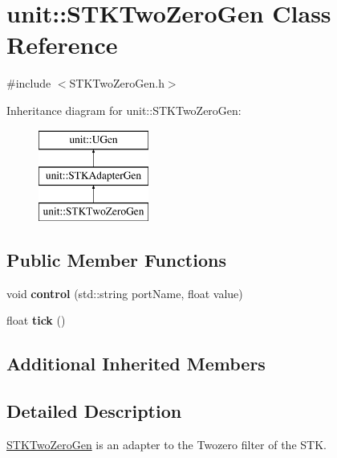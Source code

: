 \hypertarget{classunit_1_1STKTwoZeroGen}{}\section{unit\+:\+:S\+T\+K\+Two\+Zero\+Gen Class Reference}
\label{classunit_1_1STKTwoZeroGen}


{\ttfamily \#include $<$S\+T\+K\+Two\+Zero\+Gen.\+h$>$}

Inheritance diagram for unit\+:\+:S\+T\+K\+Two\+Zero\+Gen\+:\begin{figure}[H]
\begin{center}
\leavevmode
\includegraphics[height=3.000000cm]{classunit_1_1STKTwoZeroGen}
\end{center}
\end{figure}
\subsection*{Public Member Functions}
\begin{DoxyCompactItemize}
\item 
void {\bfseries control} (std\+::string port\+Name, float value)\hypertarget{classunit_1_1STKTwoZeroGen_a35f0458e31142985a3f35b603ff90e62}{}\label{classunit_1_1STKTwoZeroGen_a35f0458e31142985a3f35b603ff90e62}

\item 
float {\bfseries tick} ()\hypertarget{classunit_1_1STKTwoZeroGen_a1e9392a2e8dc67862de802e914acbf33}{}\label{classunit_1_1STKTwoZeroGen_a1e9392a2e8dc67862de802e914acbf33}

\end{DoxyCompactItemize}
\subsection*{Additional Inherited Members}


\subsection{Detailed Description}
\hyperlink{classunit_1_1STKTwoZeroGen}{S\+T\+K\+Two\+Zero\+Gen} is an adapter to the Twozero filter of the S\+TK.

